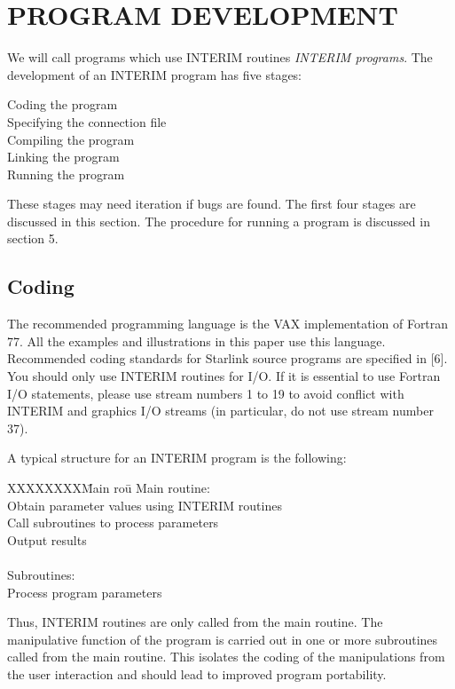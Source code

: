 \documentclass{article}
\begin{document}
\section {PROGRAM DEVELOPMENT}
We will call programs which use INTERIM routines {\em INTERIM programs}.
The development of an INTERIM  program has five stages:
\begin{description}
\item [Coding the program]
\item [Specifying the connection file]
\item [Compiling the program]
\item [Linking the program]
\item [Running the program]
\end{description}
These stages may need iteration if bugs are found.
The first four stages are discussed in this section.
The procedure for running a program is discussed in section 5.
\subsection {Coding}
The recommended programming language is the VAX implementation of Fortran 77.
All the examples and illustrations in this paper use this language.
Recommended coding standards for Starlink source programs are specified in [6].
You should only use INTERIM routines for I/O.
If it is essential to use Fortran I/O statements, please use stream numbers
1 to 19 to avoid conflict with INTERIM and graphics I/O streams (in particular,
do not use stream number 37).

A typical structure for an INTERIM program is the following:
\begin{tabbing}
XXXXXXXX\=Main rou\=\kill
\>Main routine:\\
\>\>Obtain parameter values using INTERIM routines\\
\>\>Call subroutines to process parameters\\
\>\>Output results\\
\\
\>Subroutines:\\
\>\>Process program parameters
\end{tabbing}
Thus, INTERIM routines are only called from the main routine.
The manipulative function of the program is carried out in one or more
subroutines called from the main routine.
This isolates the coding of the manipulations from the user interaction and
should lead to improved program portability.
\end{document}
